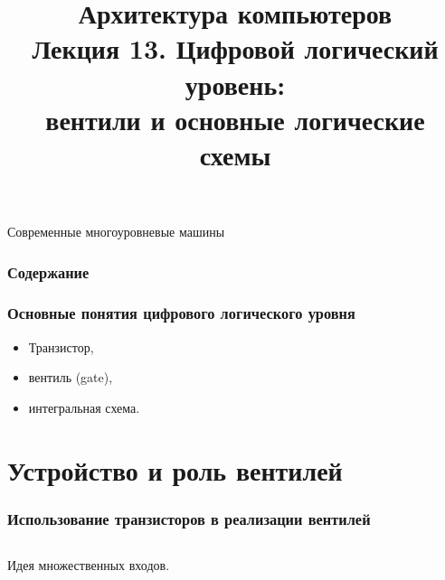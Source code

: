 \newcommand{\h}{%
handout,%
}




\usepackage{animate}

\title[Цифровая логика: вентили и схемы]{Архитектура компьютеров\texorpdfstring{\\}{ }Лекция 13. Цифровой логический уровень:\texorpdfstring{\\}{ }вентили и основные логические схемы}



\begin{frame}
\titlepage
\end{frame}

\begin{frame}{Современные многоуровневые машины}
\centering

\end{frame}

\begin{frame}
\frametitle{Содержание}
\tableofcontents
\end{frame}

\begin{frame}
\frametitle{Основные понятия цифрового логического уровня}
\begin{itemize}\itemsep=.5cm
    \item Транзистор,
    \item \Large вентиль (gate),
    \item \LARGE  интегральная схема.
\end{itemize}
\end{frame}

\section {Устройство и роль вентилей}
\begin{frame}
\frametitle{Использование транзисторов в реализации вентилей}
\begin{columns}
    \column{3cm} \pause{}
    \column{2.5cm} \pause{}
    \column{4.5cm} \pause{}
\end{columns}

\pause Идея множественных входов.
\end{frame}

